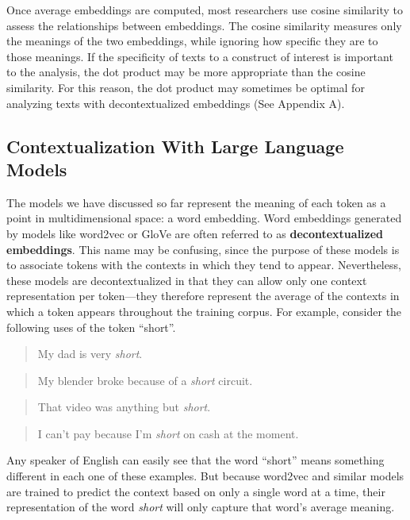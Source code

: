 \documentclass[
  man,
  floatsintext,
  longtable,
  nolmodern,
  notxfonts,
  notimes,
  colorlinks=true,linkcolor=blue,citecolor=blue,urlcolor=blue]{apa7}
\begin{document}
Once average embeddings are computed, most researchers use cosine
similarity to assess the relationships between embeddings. The cosine
similarity measures only the meanings of the two embeddings, while
ignoring how specific they are to those meanings. If the specificity of
texts to a construct of interest is important to the analysis, the dot
product may be more appropriate than the cosine similarity. For this
reason, the dot product may sometimes be optimal for analyzing texts
with decontextualized embeddings (See Appendix A).

\subsection{Contextualization With Large Language
Models}\label{contextualization-with-large-language-models}

The models we have discussed so far represent the meaning of each token
as a point in multidimensional space: a word embedding. Word embeddings
generated by models like word2vec or GloVe are often referred to as
\textbf{decontextualized embeddings}. This name may be confusing, since
the purpose of these models is to associate tokens with the contexts in
which they tend to appear. Nevertheless, these models are
decontextualized in that they can allow only one context representation
per token---they therefore represent the average of the contexts in
which a token appears throughout the training corpus. For example,
consider the following uses of the token ``short''.

\begin{quote}
My dad is very \emph{short}.
\end{quote}

\begin{quote}
My blender broke because of a \emph{short} circuit.
\end{quote}

\begin{quote}
That video was anything but \emph{short}.
\end{quote}

\begin{quote}
I can't pay because I'm \emph{short} on cash at the moment.
\end{quote}

Any speaker of English can easily see that the word ``short'' means
something different in each one of these examples. But because word2vec
and similar models are trained to predict the context based on only a
single word at a time, their representation of the word \emph{short}
will only capture that word's average meaning.
\end{document}

